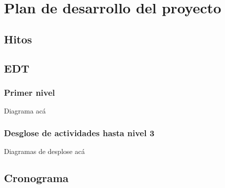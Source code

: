 \chapter{Plan de desarrollo del proyecto}
\label{appendix:planning}
\newpage
\section{Hitos}


\section{EDT}

\subsection{Primer nivel}
Diagrama acá

\subsection{Desglose de actividades hasta nivel 3}

Diagramas de desplose acá

\section{Cronograma}
\label{section:cronograma}

\tinylipsum




